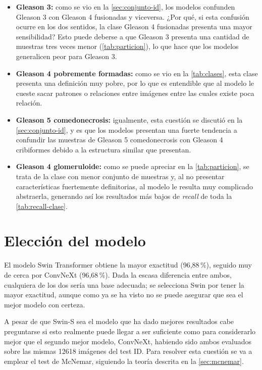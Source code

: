 \begin{itemize}
  \item \textbf{Gleason 3:} como se vio en la \cref{sec:conjunto-id}, los modelos confunden Gleason 3 con Gleason 4 fusionadas y viceversa. ¿Por qué, si esta confusión ocurre en los dos sentidos, la clase Gleason 4 fusionadas presenta una mayor sensibilidad? Esto puede deberse a que Gleason 3 presenta una cantidad de muestras tres veces menor (\cref{tab:particion}), lo que hace que los modelos generalicen peor para Gleason 3.
  \item \textbf{Gleason 4 pobremente formadas:} como se vio en la \cref{tab:clases}, esta clase presenta una definición muy pobre, por lo que es entendible que al modelo le cueste sacar patrones o relaciones entre imágenes entre las cuales existe poca relación.
  \item \textbf{Gleason 5 comedonecrosis:} igualmente, esta cuestión se discutió en la \cref{sec:conjunto-id}, y es que los modelos presentan una fuerte tendencia a confundir las muestras de Gleason 5 comedonecrosis con Gleason 4 cribiformes debido a la estructura similar que presentan.
  \item \textbf{Gleason 4 glomeruloide:} como se puede apreciar en la \cref{tab:particion}, se trata de la clase con menor conjunto de muestras y, al no presentar características fuertemente definitorias, al modelo le resulta muy complicado abstraerla, generando así los resultados más bajos de \emph{recall} de toda la \cref{tab:recall-clase}.
\end{itemize}




\section{Elección del modelo}\label{sec:eleccion-swin}

El modelo Swin Transformer obtiene la mayor exactitud (96,88\,\%), seguido muy de cerca por ConvNeXt (96,68\,\%). Dada la escasa diferencia entre ambos, cualquiera de los dos sería una base adecuada; se selecciona Swin por tener la mayor exactitud, aunque como ya se ha visto no se puede asegurar que sea el mejor modelo con certeza.


%
A pesar de que Swin-S sea el modelo que ha dado mejores resultados cabe preguntarse si esto realmente puede llegar a ser suficiente como para considerarlo mejor 
que el segundo mejor modelo, ConvNeXt, habiendo sido ambos evaluados sobre las mismas \num{12618} imágenes del test ID. Para resolver esta cuestión se va a emplear el test de McNemar, siguiendo la teoría descrita en la \cref{sec:mcnemar}.

